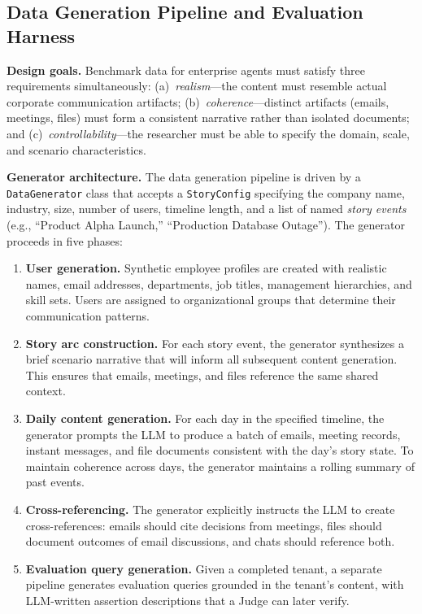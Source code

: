 \documentclass[journal,dvipsnames]{acmart}
\begin{document}
\subsection{Data Generation Pipeline and Evaluation Harness}
\label{sec:datagen}

\textbf{Design goals.}
Benchmark data for enterprise agents must satisfy three requirements
simultaneously:
(a)~\emph{realism}---the content must resemble actual corporate communication
artifacts;
(b)~\emph{coherence}---distinct artifacts (emails, meetings, files) must form a
consistent narrative rather than isolated documents; and
(c)~\emph{controllability}---the researcher must be able to specify the domain,
scale, and scenario characteristics.

\textbf{Generator architecture.}
The data generation pipeline is driven by a \texttt{DataGenerator} class that
accepts a \texttt{StoryConfig} specifying the company name, industry, size,
number of users, timeline length, and a list of named \emph{story events}
(e.g., ``Product Alpha Launch,'' ``Production Database Outage'').  The
generator proceeds in five phases:

\begin{enumerate}[leftmargin=*,itemsep=2pt]
  \item \textbf{User generation.}
    Synthetic employee profiles are created with realistic names, email
    addresses, departments, job titles, management hierarchies, and skill sets.
    Users are assigned to organizational groups that determine their
    communication patterns.

  \item \textbf{Story arc construction.}
    For each story event, the generator synthesizes a brief scenario narrative
    that will inform all subsequent content generation.  This ensures that
    emails, meetings, and files reference the same shared context.

  \item \textbf{Daily content generation.}
    For each day in the specified timeline, the generator prompts the LLM to
    produce a batch of emails, meeting records, instant messages, and file
    documents consistent with the day's story state.  To maintain coherence
    across days, the generator maintains a rolling summary of past events.

  \item \textbf{Cross-referencing.}
    The generator explicitly instructs the LLM to create cross-references:
    emails should cite decisions from meetings, files should document outcomes
    of email discussions, and chats should reference both.

  \item \textbf{Evaluation query generation.}
    Given a completed tenant, a separate pipeline generates evaluation queries
    grounded in the tenant's content, with LLM-written assertion descriptions
    that a Judge can later verify.
\end{enumerate}
\end{document}
